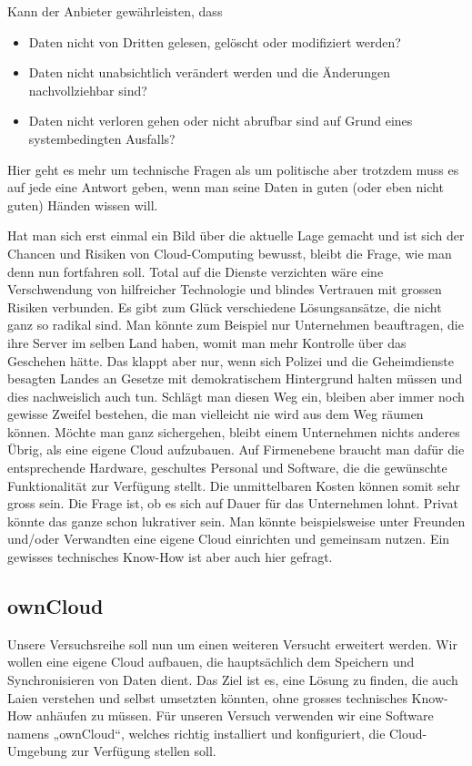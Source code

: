 Kann der Anbieter gewährleisten, dass

\begin{itemize}
\item Daten nicht von Dritten gelesen, gelöscht oder modifiziert werden?
\item Daten nicht unabsichtlich verändert werden und die Änderungen nachvollziehbar sind?
\item Daten nicht verloren gehen oder nicht abrufbar sind auf Grund eines systembedingten Ausfalls?
\end{itemize}

Hier geht es mehr um technische Fragen als um politische aber trotzdem muss es auf jede eine Antwort geben, wenn man seine Daten in guten (oder eben nicht guten) Händen wissen will.

Hat man sich erst einmal ein Bild über die aktuelle Lage gemacht und ist sich der Chancen und Risiken von Cloud-Computing bewusst, bleibt die Frage, wie man denn nun fortfahren soll. Total auf die Dienste verzichten wäre eine Verschwendung von hilfreicher Technologie und blindes Vertrauen mit grossen Risiken verbunden. Es gibt zum Glück verschiedene Lösungsansätze, die nicht ganz so radikal sind. Man könnte zum Beispiel nur Unternehmen beauftragen, die ihre Server im selben Land haben, womit man mehr Kontrolle über das Geschehen hätte. Das klappt aber nur, wenn sich Polizei und die Geheimdienste besagten Landes an Gesetze mit demokratischem Hintergrund halten müssen und dies nachweislich auch tun. Schlägt man diesen Weg ein, bleiben aber immer noch gewisse Zweifel bestehen, die man vielleicht nie wird aus dem Weg räumen können. Möchte man ganz sichergehen, bleibt einem Unternehmen nichts anderes Übrig, als eine eigene Cloud aufzubauen. Auf Firmenebene braucht man dafür die entsprechende Hardware, geschultes Personal und  Software, die die gewünschte Funktionalität zur Verfügung stellt. Die unmittelbaren Kosten können somit sehr gross sein. Die Frage ist, ob es sich auf Dauer für das Unternehmen lohnt. Privat könnte das ganze schon lukrativer sein. Man könnte beispielsweise unter Freunden und/oder Verwandten eine eigene Cloud einrichten und gemeinsam nutzen. Ein gewisses technisches Know-How ist aber auch hier gefragt. 

\subsection{ownCloud}
Unsere Versuchsreihe soll nun um einen weiteren Versucht erweitert werden. Wir wollen eine eigene Cloud aufbauen, die hauptsächlich dem Speichern und Synchronisieren von Daten dient. Das Ziel ist es, eine Lösung zu finden, die auch Laien verstehen und selbst umsetzten könnten, ohne grosses technisches Know-How anhäufen zu müssen. Für unseren Versuch verwenden wir eine Software namens „ownCloud“, welches richtig installiert und konfiguriert, die Cloud-Umgebung zur Verfügung stellen soll. 


